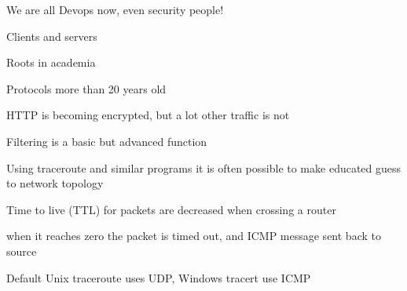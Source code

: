 \documentclass[20pt,landscape,a4paper,footrule]{foils}
\begin{document}
\centerline{We are all Devops now, even security people!}





\begin{list1}
\item Clients and servers
\item Roots in academia
\item Protocols more than 20 years old
\item HTTP is becoming encrypted, but a lot other traffic is not
\end{list1}





\centerline{}



\centerline{Filtering is a basic but advanced function}



\begin{list1}
\item Using traceroute and similar programs it is often possible to make educated guess to network topology
\item Time to live (TTL) for packets are decreased when crossing a router
\item when it reaches zero the packet is timed out, and ICMP message sent back to source
\item Default Unix traceroute uses UDP, Windows tracert use ICMP
\end{list1}


\end{document}
